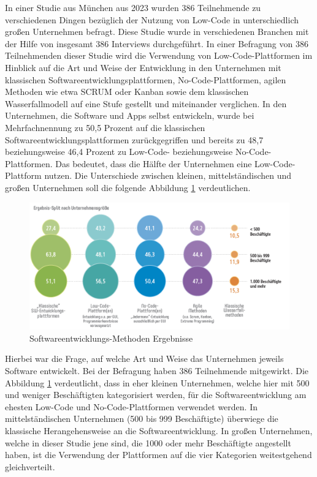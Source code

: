 \documentclass[acmtog, language=ngerman]{acmart}
\begin{document}
In einer Studie aus München aus 2023 wurden 386 Teilnehmende zu verschiedenen Dingen bezüglich der Nutzung von Low-Code in unterschiedlich großen Unternehmen befragt. \cite{studie_low_code}  Diese Studie wurde in verschiedenen Branchen mit der Hilfe von insgesamt 386 Interviews durchgeführt. 
In einer Befragung von 386 Teilnehmenden dieser Studie wird die Verwendung von Low-Code-Plattformen im Hinblick auf die Art und Weise der Entwicklung in den Unternehmen mit klassischen Softwareentwicklungsplattformen, No-Code-Plattformen, agilen Methoden wie etwa SCRUM oder Kanban sowie dem klassischen Wasserfallmodell auf eine Stufe gestellt und miteinander verglichen.
In den Unternehmen, die Software und Apps selbst entwickeln, wurde bei Mehrfachnennung zu 50,5 Prozent auf die klassischen Softwareentwicklungsplattformen zurückgegriffen und bereits zu 48,7 beziehungsweise 46,4 Prozent \cite{studie_low_code} zu Low-Code- beziehungsweise No-Code-Plattformen. Das bedeutet, dass die Hälfte der Unternehmen eine Low-Code-Plattform nutzen.
Die Unterschiede zwischen kleinen, mittelständischen und großen Unternehmen soll die folgende Abbildung \ref{fig:lowcode_nutzer} verdeutlichen.
\begin{figure} [h]
    \centering
    \includegraphics[width=1\linewidth]{images/studie_lowcodenutzer.png}
    \caption{Softwareentwicklungs-Methoden Ergebnisse \cite{studie_low_code}}
    \label{fig:lowcode_nutzer}
\end{figure}
Hierbei war die Frage, auf welche Art und Weise das Unternehmen jeweils Software entwickelt. Bei der Befragung haben 386 Teilnehmende mitgewirkt. Die Abbildung \ref{fig:lowcode_nutzer} verdeutlicht, dass in eher kleinen Unternehmen, welche hier mit 500 und weniger Beschäftigten kategorisiert werden, für die Softwareentwicklung am ehesten Low-Code und No-Code-Plattformen verwendet werden.
In mittelständischen Unternehmen (500 bis 999 Beschäftigte) überwiege die klassische Herangehensweise an die Softwareentwicklung. 
In großen Unternehmen, welche in dieser Studie jene sind, die 1000 oder mehr Beschäftigte angestellt haben, ist die Verwendung der Plattformen auf die vier Kategorien weitestgehend gleichverteilt.
\\
\end{document}
